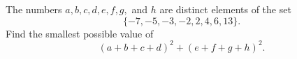 The numbers $a, b, c, d, e, f, g,$ and $h$ are distinct elements of the set \[\{-7, -5, -3, -2, 2, 4, 6, 13\}.\]Find the smallest possible value of \[(a+b+c+d)^{2}+(e+f+g+h)^{2}.\]
